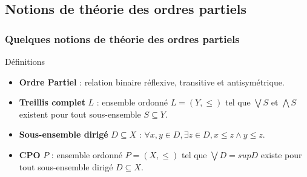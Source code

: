 \documentclass{beamer}
\begin{document}
\subsection{Notions de théorie des ordres partiels}

\begin{frame}
\frametitle{Quelques notions de théorie des ordres partiels}

\begin{block}{Définitions}
\begin{itemize}
\item<1-> \textbf{Ordre Partiel} : relation binaire réflexive, transitive et antisymétrique.
\item<1-> \textbf{Treillis complet} $L$ : ensemble ordonné $L = (Y, \leq)$ tel que $\bigvee S$ et $\bigwedge S$ existent pour tout sous-ensemble $S \subseteq Y$.

\medskip

\item<2-> \textbf{Sous-ensemble dirigé} $D \subseteq X$ : %
$\forall x, y \in D, \exists z \in D, x \leq z \wedge y \leq z$.
\item<2-> \textbf{CPO} $P$ : ensemble ordonné $P = (X, \leq)$ tel que $\bigvee D = sup D$ existe pour tout sous-ensemble dirigé $D \subseteq X$.


\end{itemize}
\end{block}


\end{frame}
\end{document}
